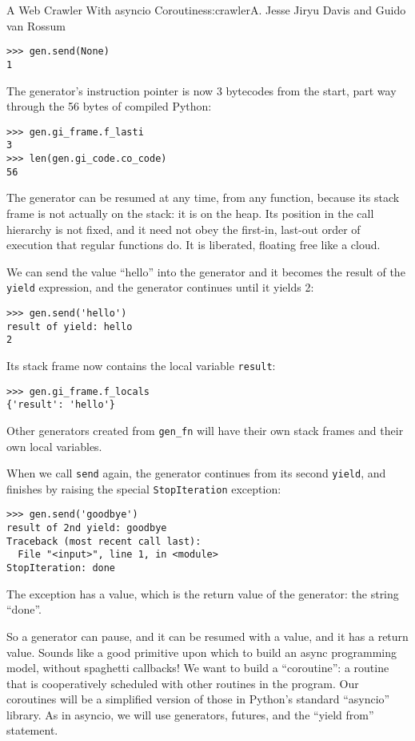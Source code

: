 \begin{aosachapter}{A Web Crawler With asyncio Coroutines}{s:crawler}{A. Jesse Jiryu Davis and Guido van Rossum}
\begin{verbatim}
>>> gen.send(None)
1
\end{verbatim}

The generator's instruction pointer is now 3 bytecodes from the start,
part way through the 56 bytes of compiled Python:

\begin{verbatim}
>>> gen.gi_frame.f_lasti
3
>>> len(gen.gi_code.co_code)
56
\end{verbatim}

The generator can be resumed at any time, from any function, because its
stack frame is not actually on the stack: it is on the heap. Its
position in the call hierarchy is not fixed, and it need not obey the
first-in, last-out order of execution that regular functions do. It is
liberated, floating free like a cloud.

We can send the value ``hello'' into the generator and it becomes the
result of the \texttt{yield} expression, and the generator continues
until it yields 2:

\begin{verbatim}
>>> gen.send('hello')
result of yield: hello
2
\end{verbatim}

Its stack frame now contains the local variable \texttt{result}:

\begin{verbatim}
>>> gen.gi_frame.f_locals
{'result': 'hello'}
\end{verbatim}

Other generators created from \texttt{gen\_fn} will have their own stack
frames and their own local variables.

When we call \texttt{send} again, the generator continues from its
second \texttt{yield}, and finishes by raising the special
\texttt{StopIteration} exception:

\begin{verbatim}
>>> gen.send('goodbye')
result of 2nd yield: goodbye
Traceback (most recent call last):
  File "<input>", line 1, in <module>
StopIteration: done
\end{verbatim}

The exception has a value, which is the return value of the generator:
the string ``done''.

\label{building-coroutines-with-generators}

So a generator can pause, and it can be resumed with a value, and it has
a return value. Sounds like a good primitive upon which to build an
async programming model, without spaghetti callbacks! We want to build a
``coroutine'': a routine that is cooperatively scheduled with other
routines in the program. Our coroutines will be a simplified version of
those in Python's standard ``asyncio'' library. As in asyncio, we will
use generators, futures, and the ``yield from'' statement.


\end{aosachapter}

